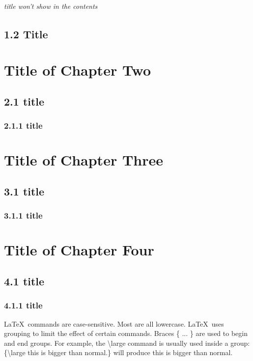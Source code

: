 \documentclass[12pt,openright]{book}
\begin{document}
\subparagraph{title won't show in the contents}
\lipsum[1-3]

\section{1.2 Title}
\lipsum[1-5]

\chapter{Title of Chapter Two}
\lipsum[1-3]

\section{2.1 title}
\lipsum[1-5]

\subsection{2.1.1 title}
\lipsum[1-5]

\chapter{Title of Chapter Three}
\lipsum[1-3]

\section{3.1 title}
\lipsum[1-5]

\subsection{3.1.1 title}
\lipsum[1-3]

\chapter{Title of Chapter Four}
\lipsum[1-2]

\section{4.1 title}
\lipsum[1-3]

\subsection{4.1.1 title}

\LaTeX\ commands are case-sensitive. Most are all lowercase. \LaTeX\ uses grouping to limit the effect of certain commands. Braces \{ ... \} are used to begin and end groups. For example, the
\textbackslash large command is usually used inside a group: \{\textbackslash large this is bigger than normal.\}  will produce {\large this is bigger than normal.} 
\end{document}
